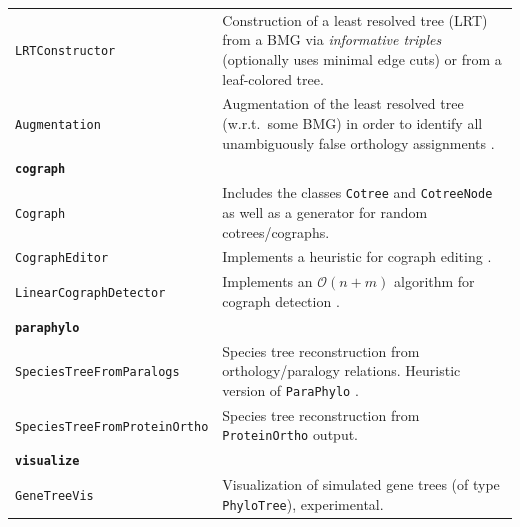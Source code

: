 \documentclass[hidelinks,11pt]{article}
\begin{document}
{\begin{longtable}{| p{4.0cm} | p{10cm} |}
	\texttt{LRTConstructor} & 
	Construction of a least resolved tree (LRT) from a BMG via \emph{informative triples} (optionally uses minimal edge cuts) or from a leaf-colored tree. \\
	\texttt{Augmentation} & 
	Augmentation of the least resolved tree (w.r.t.\ some BMG) in order to identify all unambiguously false orthology assignments \citep{schaller2020}. \\
	\hline
	\multicolumn{2}{|l|}{\textbf{\texttt{cograph}}}\\
	\hline
	\texttt{Cograph} & 
	Includes the classes \texttt{Cotree} and \texttt{CotreeNode} as well as a generator for random cotrees/cographs. \\
	\texttt{CographEditor} & 
	Implements a heuristic for cograph editing \citep{crespelle2019}. \\
	\texttt{LinearCographDetector} & 
	Implements an $\mathcal{O}(n+m)$ algorithm for cograph detection \citep{corneil1985}. \\
	\hline
	\multicolumn{2}{|l|}{\textbf{\texttt{paraphylo}}}\\
	\hline
	\texttt{SpeciesTreeFromParalogs} & 
	Species tree reconstruction from orthology/paralogy relations. Heuristic version of \texttt{ParaPhylo} \cite{hellmuth2015}. \\
	\texttt{SpeciesTreeFrom\newline ProteinOrtho} & 
	Species tree reconstruction from \texttt{ProteinOrtho} \cite{lechner2011,lechner2014} output. \\
	\hline
	\multicolumn{2}{|l|}{\textbf{\texttt{visualize}}}\\
	\hline
	\texttt{GeneTreeVis} & 
	Visualization of simulated gene trees (of type \texttt{PhyloTree}), experimental. \\
\end{longtable}
}
\end{document}
